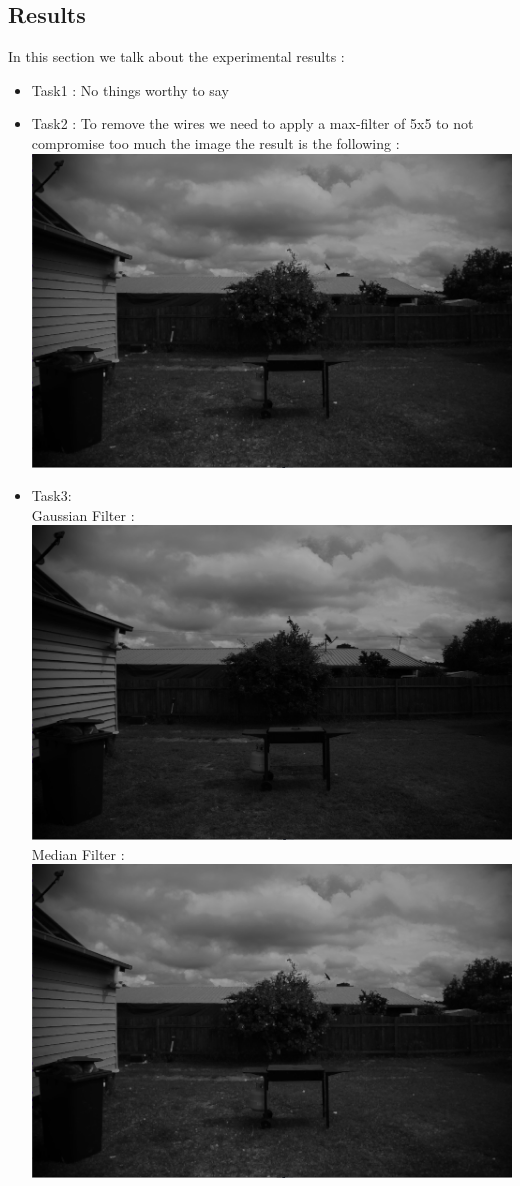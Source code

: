 \documentclass{article}
\begin{document}
\begin{flushleft}
\newpage
\subsection*{Results}
In this section we talk about the experimental results :
\begin{itemize}
  \item Task1 : No things worthy to say 
  \item Task2 : To remove the wires we need to apply a max-filter of 5x5 to not compromise too much the image the result is the following :
  \includegraphics[scale = 0.35]{images/max_filter5x5.png}
  \item Task3:\\
  Gaussian Filter :
  \includegraphics[scale = 0.35]{images/gaussing_filter_3x3.png}
  Median Filter :
  \includegraphics[scale = 0.35]{max_filter5x5}

\end{itemize}
\end{flushleft}
\end{document}
